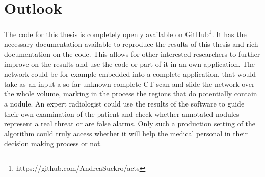 \documentclass[main.tex]{subfiles}
\begin{document}
\section{Outlook}
The code for this thesis is completely openly available on \href{https://github.com/AndreaSuckro/acts}{GitHub}\footnote{https://github.com/AndreaSuckro/acts}. It has the necessary documentation available to reproduce the results of this thesis and rich documentation on the code. This allows for other interested researchers to further improve on the results and use the code or part of it in an own application. The network could be for example embedded into a complete application, that would take as an input a so far unknown complete CT scan and slide the network over the whole volume, marking in the process the regions that do potentially contain a nodule. An expert radiologist could use the results of the software to guide their own examination of the patient and check whether annotated nodules represent a real threat or are false alarms. Only such a production setting of the algorithm could truly access whether it will help the medical personal in their decision making process or not.


\end{document}

